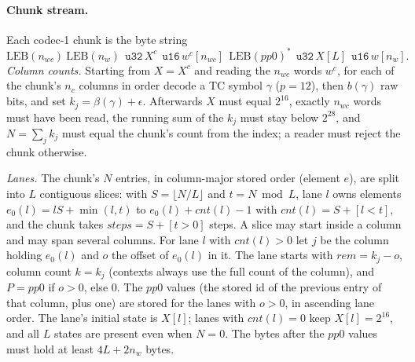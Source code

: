 \paragraph{Chunk stream.}
\label{spec:chunk}
Each codec-1 chunk is the byte string
\[
\mathrm{LEB}(n_{wc})\ \mathrm{LEB}(n_w)\ \ \texttt{u32}\,X^{c}\ \ \texttt{u16}\,w^{c}[n_{wc}]\ \ \mathrm{LEB}(\mathit{pp0})^{*}\ \ \texttt{u32}\,X[L]\ \ \texttt{u16}\,w[n_w].
\]
\emph{Column counts.} Starting from $X=X^{c}$ and reading the $n_{wc}$ words $w^{c}$, for each of the chunk's $n_c$
columns in order decode a TC symbol $\gamma$ ($p=12$), then $b(\gamma)$ raw bits, and set $k_j=\beta(\gamma)+\epsilon$.
Afterwards $X$ must equal $2^{16}$, exactly $n_{wc}$ words must have been read, the running sum of the $k_j$ must stay
below $2^{28}$, and $N=\sum_j k_j$ must equal the chunk's count from the index; a reader must reject the chunk otherwise.

\emph{Lanes.} The chunk's $N$ entries, in column-major stored order (element $e$), are split into $L$ contiguous
slices: with $S=\lfloor N/L\rfloor$ and $t=N\bmod L$, lane $l$ owns elements $e_0(l)=lS+\min(l,t)$ to
$e_0(l)+\mathit{cnt}(l)-1$ with $\mathit{cnt}(l)=S+[l<t]$, and the chunk takes $\mathit{steps}=S+[t>0]$ steps. A slice
may start inside a column and may span several columns. For lane $l$ with $\mathit{cnt}(l)>0$ let $j$ be the column
holding $e_0(l)$ and $o$ the offset of $e_0(l)$ in it. The lane starts with $\mathit{rem}=k_j-o$, column count
$k=k_j$ (contexts always use the full count of the column), and $P=\mathit{pp0}$ if $o>0$, else 0. The $\mathit{pp0}$
values (the stored id of the previous entry of that column, plus one) are stored for the lanes with $o>0$, in ascending
lane order. The lane's initial state is $X[l]$; lanes with $\mathit{cnt}(l)=0$ keep $X[l]=2^{16}$, and all $L$ states
are present even when $N=0$. The bytes after the $\mathit{pp0}$ values must hold at least $4L+2n_w$ bytes.

